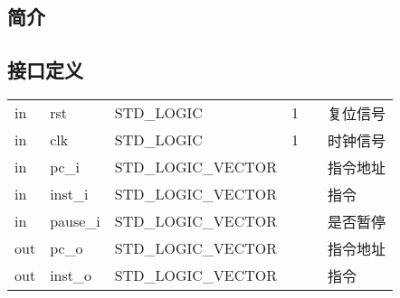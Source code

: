 \documentclass{article}
\begin{document}
\subsection{简介}

\FloatBarrier
\subsection{接口定义}

\begin{center}




    \tablelasttail{\bottomrule}

    \small
    \begin{supertabular}{lllllp{2cm}}

    in & rst\label{IF/ID:rst} & STD_LOGIC & 1 &  & 复位信号 \\
    in & clk\label{IF/ID:clk} & STD_LOGIC & 1 &  & 时钟信号 \\
    in & pc_i\label{IF/ID:pc_i} & STD_LOGIC_VECTOR &  &  & 指令地址 \\
    in & inst_i\label{IF/ID:inst_i} & STD_LOGIC_VECTOR &  &  & 指令 \\
    in & pause_i\label{IF/ID:pause_i} & STD_LOGIC_VECTOR &  &  & 是否暂停 \\
    out & pc_o\label{IF/ID:pc_o} & STD_LOGIC_VECTOR &  &  & 指令地址 \\
    out & inst_o\label{IF/ID:inst_o} & STD_LOGIC_VECTOR &  &   & 指令 \\

    \end{supertabular}
\end{center}
\FloatBarrier
\end{document}
